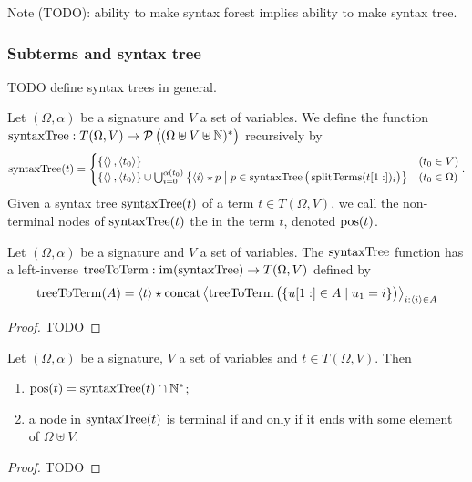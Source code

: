 Note (TODO): ability to make syntax forest implies ability to make syntax tree.

\subsubsection{Subterms and syntax tree}
TODO define syntax trees in general.

\begin{definition}
Let $(\Omega, \alpha)$ be a signature and $V$ a set of variables. We define the \udef{$\syntaxTree$} function $\operatorname{syntaxTree}: T(\Omega, V) \to \operatorname{\mathcal{P}}\big((\Omega \uplus V \uplus \mathbb{N})^*\big)$ recursively by
\[ \syntaxTree(t) = \begin{cases}
\{\seq{}, \seq{t_0}\} & (t_0\in V) \\
\{\seq{}, \seq{t_0}\} \cup \bigcup_{i=0}^{\alpha(t_0)}\setbuilder{\seq{i}\concat p}{p\in \syntaxTree\big(\splitTerms(t[1:])_i\big)} & (t_0\in \Omega)
\end{cases}. \]
Given a syntax tree $\operatorname{syntaxTree}(t)$ of a term $t\in T(\Omega, V)$, we call the non-terminal nodes of $\operatorname{syntaxTree}(t)$ the  in the term $t$, denoted $\operatorname{pos}(t)$.
\end{definition}

\begin{lemma}
Let $(\Omega, \alpha)$ be a signature and $V$ a set of variables. The $\syntaxTree$ function has a left-inverse $\operatorname{treeToTerm}: \operatorname{im}(\operatorname{syntaxTree}) \to T(\Omega, V)$ defined by
\[ \treeToTerm(A) = \seq{t} \concat \strConcat \seq{\treeToTerm\big(\setbuilder{u[1:]\in A}{u_1 = i}\big)}_{i:\seq{i}\in A} \]
\end{lemma}
\begin{proof}
TODO
\end{proof}


\begin{lemma} \label{positionsSyntaxTreeNumeric}
Let $(\Omega, \alpha)$ be a signature, $V$ a set of variables and $t\in T(\Omega, V)$. Then
\begin{enumerate}
\item $\operatorname{pos}(t) = \operatorname{syntaxTree}(t) \cap \mathbb{N}^*$;
\item a node in $\operatorname{syntaxTree}(t)$ is terminal \textup{if and only if} it ends with some element of $\Omega \uplus V$.
\end{enumerate}
\end{lemma}
\begin{proof}
TODO
\end{proof}

